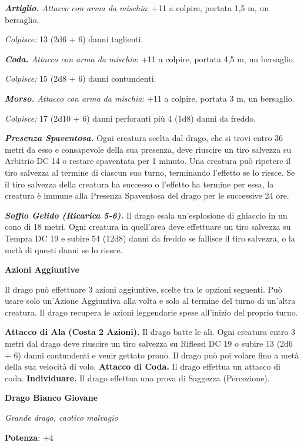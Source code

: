 \begin{multicols}{2}
\emph{\textbf{Artiglio.} Attacco con arma da mischia}: +11 a colpire,
portata 1,5 m, un bersaglio.

\emph{Colpisce:} 13 (2d6 + 6) danni taglienti.

\emph{\textbf{Coda.} Attacco con arma da mischia}: +11 a colpire,
portata 4,5 m, un bersaglio.

\emph{Colpisce:} 15 (2d8 + 6) danni contundenti.

\emph{\textbf{Morso.} Attacco con arma da mischia}: +11 a colpire,
portata 3 m, un bersaglio.

\emph{Colpisce:} 17 (2d10 + 6) danni perforanti più 4 (1d8) danni da
freddo.

\emph{\textbf{Presenza Spaventosa.}} Ogni creatura scelta dal drago, che
si trovi entro 36 metri da esso e consapevole della sua presenza, deve
riuscire un tiro salvezza su Arbitrio DC 14 o restare spaventata per 1
minuto. Una creatura può ripetere il tiro salvezza al termine di ciascun
suo turno, terminando l'effetto se lo riesce. Se il tiro salvezza della
creatura ha successo o l'effetto ha termine per essa, la creatura è
immune alla Presenza Spaventosa del drago per le successive 24 ore.

\emph{\textbf{Soffio Gelido (Ricarica 5-6).}} Il drago esala
un'esplosione di ghiaccio in un cono di 18 metri. Ogni creatura in
quell'area deve effettuare un tiro salvezza su Tempra DC 19 e
subire 54 (12d8) danni da freddo se fallisce il tiro salvezza, o la metà
di questi danni se lo riesce.

\textbf{Azioni Aggiuntive}

Il drago può effettuare 3 azioni aggiuntive, scelte tra le opzioni
seguenti. Può usare solo un'Azione Aggiuntiva alla volta e solo al
termine del turno di un'altra creatura. Il drago recupera le azioni
leggendarie spese all'inizio del proprio turno.

\textbf{Attacco di Ala (Costa 2 Azioni).} Il drago batte le ali. Ogni
creatura entro 3 metri dal drago deve riuscire un tiro salvezza su Riflessi DC 19 o subire 13 (2d6 + 6) danni contundenti e venir gettato
prono. Il drago può poi volare fino a metà della sua velocità di volo.
\textbf{Attacco di Coda.} Il drago effettua un attacco di coda.
\textbf{Individuare.} Il drago effettua una prova di Saggezza
(Percezione).

\textbf{Drago Bianco Giovane}

\emph{Grande drago, caotico malvagio}

\textbf{Potenza}: +4


\end{multicols}
